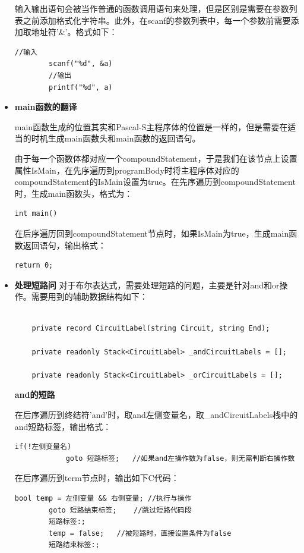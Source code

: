 \documentclass[../main.tex]{subfiles}
\begin{document}
\begin{itemize}
    输入输出语句会被当作普通的函数调用语句来处理，但是区别是需要在参数列表之前添加格式化字符串。此外，在scanf的参数列表中，每一个参数前需要添加取地址符'\&'。格式如下：
    \begin{lstlisting}[style = c]
        //输入
        scanf("%d", &a)
        //输出
        printf("%d", a) 
    \end{lstlisting}

    \item \textbf{main函数的翻译}

    main函数生成的位置其实和Pascal-S主程序体的位置是一样的，但是需要在适当的时机生成main函数头和main函数的返回语句。

    由于每一个函数体都对应一个compoundStatement，于是我们在该节点上设置属性IsMain，在先序遍历到programBody时将主程序体对应的compoundStatement的IsMain设置为true。在先序遍历到compoundStatement时，生成main函数头，格式为：
    \begin{lstlisting}[style = c]
        int main() 
    \end{lstlisting}
    在后序遍历回到compoundStatement节点时，如果IsMain为true，生成main函数返回语句，输出格式：
    \begin{lstlisting}[style = c]
        return 0;
    \end{lstlisting}
    
    \item \textbf{处理短路问}
    对于布尔表达式，需要处理短路的问题，主要是针对and和or操作。需要用到的辅助数据结构如下：
    \begin{lstlisting}[style = csharp]
    
    private record CircuitLabel(string Circuit, string End);

    private readonly Stack<CircuitLabel> _andCircuitLabels = [];

    private readonly Stack<CircuitLabel> _orCircuitLabels = [];    
    \end{lstlisting}

    \textbf{and的短路}

    在后序遍历到终结符'and'时，取and左侧变量名，取\_andCircuitLabels栈中的and短路标签，输出格式：
    \begin{lstlisting}[style = c]
        if(!左侧变量名)
            goto 短路标签;   //如果and左操作数为false，则无需判断右操作数
    \end{lstlisting}

    在后序遍历到term节点时，输出如下C代码：
    \begin{lstlisting}[style = c]
        bool temp = 左侧变量 && 右侧变量; //执行与操作
        goto 短路结束标签;    //跳过短路代码段
        短路标签:;
        temp = false;   //被短路时，直接设置条件为false
        短路结束标签:;
    \end{lstlisting}


\end{itemize}
\end{document}
